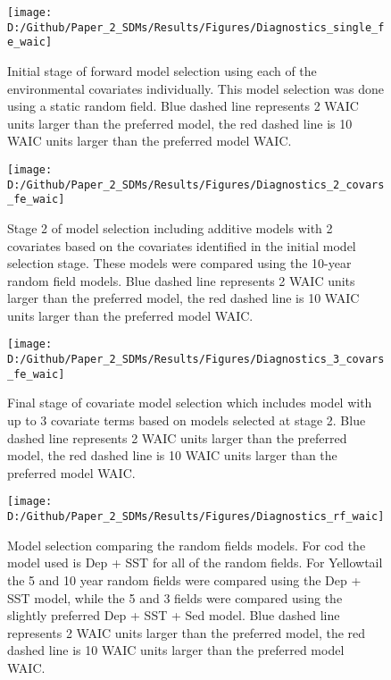 \documentclass[
]{article}
\begin{document}
\begin{landscape}
\begin{landscape}
\begin{figure}[htb]
{\centering \texttt{[image: D:/Github/Paper\_2\_SDMs/Results/Figures/Diagnostics\_single\_fe\_waic]} 

}

\caption{Initial stage of forward model selection using each of the environmental covariates individually.  This model selection was done using a static random field. Blue dashed line represents 2 WAIC units larger than the preferred model, the red dashed line is 10 WAIC units larger than the preferred model WAIC. }\label{fig:diag-1-fe}
\end{figure}

\newpage
\begin{figure}[htb]

{\centering \texttt{[image: D:/Github/Paper\_2\_SDMs/Results/Figures/Diagnostics\_2\_covars\_fe\_waic]} 

}

\caption{Stage 2 of model selection including additive models with 2 covariates based on the covariates identified in the initial model selection stage. These models were compared using the 10-year random field models. Blue dashed line represents 2 WAIC units larger than the preferred model, the red dashed line is 10 WAIC units larger than the preferred model WAIC.}\label{fig:diag-2-fe}
\end{figure}

\newpage
\begin{figure}[htb]

{\centering \texttt{[image: D:/Github/Paper\_2\_SDMs/Results/Figures/Diagnostics\_3\_covars\_fe\_waic]} 

}

\caption{Final stage of covariate model selection which includes model with up to 3 covariate terms based on models selected at stage 2. Blue dashed line represents 2 WAIC units larger than the preferred model, the red dashed line is 10 WAIC units larger than the preferred model WAIC.}\label{fig:diag-3-fe}
\end{figure}

\newpage
\begin{figure}[htb]

{\centering \texttt{[image: D:/Github/Paper\_2\_SDMs/Results/Figures/Diagnostics\_rf\_waic]} 

}

\caption{Model selection comparing the random fields models.  For cod the model used is Dep + SST for all of the random fields.  For Yellowtail the 5 and 10 year random fields were compared using the Dep + SST model, while the 5 and 3 fields were compared using the slightly preferred Dep + SST + Sed model. Blue dashed line represents 2 WAIC units larger than the preferred model, the red dashed line is 10 WAIC units larger than the preferred model WAIC.}\label{fig:diag-rf}
\end{figure}
\end{landscape}


\end{landscape}
\end{document}
